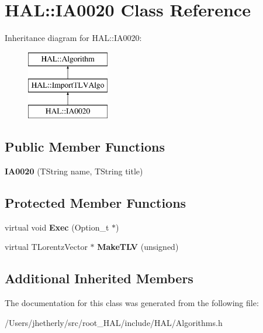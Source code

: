 \hypertarget{class_h_a_l_1_1_i_a0020}{\section{H\-A\-L\-:\-:I\-A0020 Class Reference}
\label{class_h_a_l_1_1_i_a0020}
}
Inheritance diagram for H\-A\-L\-:\-:I\-A0020\-:\begin{figure}[H]
\begin{center}
\leavevmode
\includegraphics[height=3.000000cm]{class_h_a_l_1_1_i_a0020}
\end{center}
\end{figure}
\subsection*{Public Member Functions}
\begin{DoxyCompactItemize}
\item 
\hypertarget{class_h_a_l_1_1_i_a0020_a7e28d08e71591d8e156164039cb7c07a}{{\bfseries I\-A0020} (T\-String name, T\-String title)}\label{class_h_a_l_1_1_i_a0020_a7e28d08e71591d8e156164039cb7c07a}

\end{DoxyCompactItemize}
\subsection*{Protected Member Functions}
\begin{DoxyCompactItemize}
\item 
\hypertarget{class_h_a_l_1_1_i_a0020_ac2616410fe28dc70d7b6f6883fe8813e}{virtual void {\bfseries Exec} (Option\-\_\-t $\ast$)}\label{class_h_a_l_1_1_i_a0020_ac2616410fe28dc70d7b6f6883fe8813e}

\item 
\hypertarget{class_h_a_l_1_1_i_a0020_aa2b81352888484e42bfc14070c0c9142}{virtual T\-Lorentz\-Vector $\ast$ {\bfseries Make\-T\-L\-V} (unsigned)}\label{class_h_a_l_1_1_i_a0020_aa2b81352888484e42bfc14070c0c9142}

\end{DoxyCompactItemize}
\subsection*{Additional Inherited Members}


The documentation for this class was generated from the following file\-:\begin{DoxyCompactItemize}
\item 
/\-Users/jhetherly/src/root\-\_\-\-H\-A\-L/include/\-H\-A\-L/Algorithms.\-h\end{DoxyCompactItemize}
